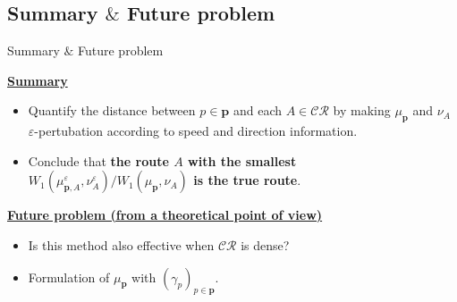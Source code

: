 \documentclass[aspectratio=169, bigfiles]{beamer}
\newcommand{\derr}{\mathsf{d}_{\mathsf{Err}}}
\newcommand{\CR}{\mathcal{CR}}
\newcommand{\R}{\mathbb{R}}
\newcommand{\eps}{\varepsilon} %
\begin{document}
\subsection{Summary $\&$ Future problem}

\begin{frame}{Summary $\&$ Future problem}
\begin{small}
\begin{tcolorbox}[colframe=black,
colback=black!10!white,
colbacktitle=black!40!white,
coltitle=black, fonttitle=\bfseries]
\textbf{\underline{Summary}}\,
\begin{itemize}
\item Quantify the distance between $p\in\mathbf{p}$ and each $A\in\CR$ by making $\mu_\mathbf{p}$ and $\nu_A$ $\eps$-pertubation according to speed and direction information.
\item Conclude that \textbf{the route $A$ with the smallest $W_1(\mu_{\mathbf{p},A}^\eps,\nu_A^\eps)/W_1(\mu_\mathbf{p},\nu_A)$ is the true route}.
\end{itemize}
\end{tcolorbox}
\vspace{1mm}
\begin{tcolorbox}[colframe=yellow,
colback=yellow!10!white,
colbacktitle=yellow!40!white,
coltitle=black, fonttitle=\bfseries]
\textbf{\underline{Future problem (from a theoretical point of view)}}\,
\begin{itemize}
\item Is this method also effective when $\CR$ is dense?
\item Formulation of $\mu_\mathbf{p}$ with $(\gamma_p)_{p\in\mathbf{p}}$.
\end{itemize}
\end{tcolorbox}
\end{small}
\end{frame}

\end{document}
